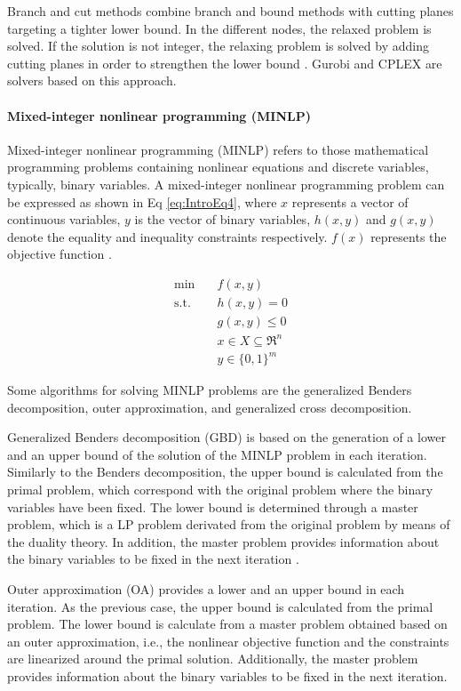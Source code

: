 \begin{refsection}[referencesCh1]
Branch and cut methods combine branch and bound methods with cutting planes targeting a tighter lower bound. In the different nodes, the relaxed problem is solved. If the solution is not integer, the relaxing problem is solved by adding cutting planes in order to strengthen the lower bound \citep{grossmann2021advanced}. Gurobi \citep{gurobi} and CPLEX \citep{cplex2009v12} are solvers based on this approach.

\paragraph{Mixed-integer nonlinear programming (MINLP)}
Mixed-integer nonlinear programming (MINLP) refers to those mathematical programming problems containing nonlinear equations and discrete variables, typically, binary variables. A mixed-integer nonlinear programming problem can be expressed as shown in Eq \ref{eq:IntroEq4}, where $x$ represents a vector of continuous variables, $y$ is the vector of binary variables, $h(x,y)$ and $g(x,y)$ denote the equality and inequality constraints respectively. $f(x)$ represents the objective function \citep{grossmann2021advanced}.

\begin{align}
	\min \quad & f(x,y) \nonumber\\
	\textrm{s.t.} \quad & h(x,y)=0 \nonumber\\
	& g(x,y) \leq 0 \label{eq:IntroEq4} \\
	& x \in X  \subseteq \Re^{n} \nonumber\\ 
	& y \in \lbrace 0,1 \rbrace ^{m} \nonumber
\end{align}  

Some algorithms for solving MINLP problems are the generalized Benders decomposition, outer approximation, and generalized cross decomposition. 

Generalized Benders decomposition (GBD) is based on the generation of a lower and an upper bound of the solution of the MINLP problem in each iteration. Similarly to the Benders decomposition, the upper bound is calculated from the primal problem, which correspond with the original problem where the binary variables have been fixed. The lower bound is determined through a master problem, which is a LP problem derivated from the original problem by means of the duality theory.  In addition, the master problem provides
information about the binary variables to be fixed in the next iteration \citep{floudas1995nonlinear}.

Outer approximation (OA) provides a lower and an upper bound in each iteration. As the previous case, the upper bound is calculated from the primal problem. The lower bound is calculate from a master problem obtained based on an outer approximation, i.e., the nonlinear objective function and the constraints are linearized around the primal solution. Additionally, the master problem provides information about the binary variables to be fixed in the next iteration.


\end{refsection}
